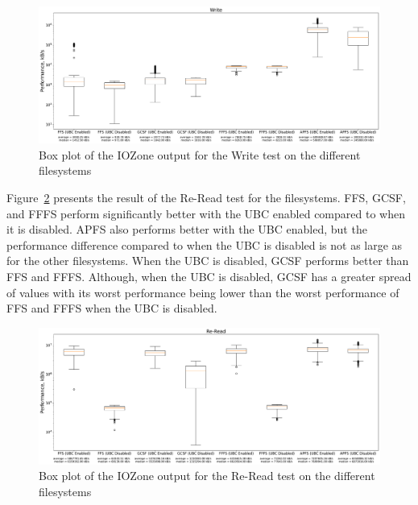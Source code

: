 \begin{figure}
	\label{fig:res_box_write}
	\begin{center}
		\includegraphics[width=1.0\textwidth]{figures.nosync/benchmarking/Write-boxplot.pdf}
	\end{center}
	\caption[Box plot of the IOZone output for the Write test]{Box plot of the IOZone output for the Write test on the different filesystems}
\end{figure}

\FloatBarrier

Figure~\ref{fig:res_box_reread} presents the result of the \mbox{Re-Read} test for the filesystems. \gls{FFS}, \gls{GCSF}, and \gls{FFFS} perform significantly better with the \gls{UBC} enabled compared to when it is disabled. \gls{APFS} also performs better with the \gls{UBC} enabled, but the performance difference compared to when the \gls{UBC} is disabled is not as large as for the other filesystems. When the \gls{UBC} is disabled, \gls{GCSF} performs better than \gls{FFS} and \gls{FFFS}. Although, when the \gls{UBC} is disabled, \gls{GCSF} has a greater spread of values with its worst performance being lower than the worst performance of \gls{FFS} and \gls{FFFS} when the \gls{UBC} is disabled.

\begin{figure}
	\label{fig:res_box_reread}
	\begin{center}
		\includegraphics[width=1.0\textwidth]{figures.nosync/benchmarking/Re-Read-boxplot.pdf}
	\end{center}
	\caption[Box plot of the IOZone output for the Re-Read test]{Box plot of the IOZone output for the Re-Read test on the different filesystems}
\end{figure}


